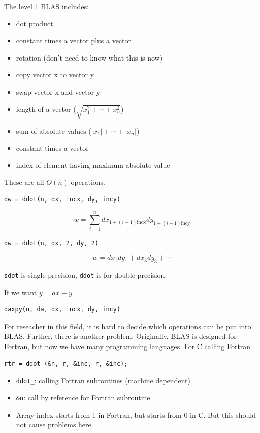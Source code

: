 The level 1 BLAS includes:
\begin{itemize}
    \item dot product
    \item constant times a vector plus a vector
    \item rotation (don’t need to know what this is now)
    \item copy vector x to vector y
    \item swap vector x and vector y
    \item length of a vector ($\sqrt{x_1^2 + \cdots + x_n^2}$)
    \item sum of absolute values ($|x_1| + \cdots + |x_n|$)
    \item constant times a vector
    \item index of element having maximum absolute value
\end{itemize}
These are all $O(n)$ operations. 

\begin{verbatim}
dw = ddot(n, dx, incx, dy, incy)
\end{verbatim}
\[
    w = \sum_{i=1}^n dx_{1+ (i-1)\text{incx}} dy_{1 + (i-1)\text{incy}}
\]

\begin{verbatim}
dw = ddot(n, dx, 2, dy, 2)
\end{verbatim}
\[
    w = dx_1 dy_1 + dx_3dy_3 + \cdots
\]

\begin{note}
    \texttt{sdot} is single precision, \texttt{ddot} is for double precision.
\end{note}

If we want $y = ax + y$
\begin{verbatim}
daxpy(n, da, dx, incx, dy, incy)    
\end{verbatim}

For reseacher in this field, it is hard to decide which operations can be put into BLAS. Further, there is another problem: Originally, BLAS is designed for Fortran, but now we have many programming languages. For C calling Fortran

\begin{verbatim}
rtr = ddot_(&n, r, &inc, r, &inc);
\end{verbatim}
\begin{itemize}
    \item \texttt{ddot\_}: calling Fortran subroutines (machine dependent)
    \item \texttt{\&n}: call by reference for Fortran subroutine.
    \item Array index starts from 1 in Fortran, but starts from 0 in C. But this should not cause problems here.
\end{itemize}

